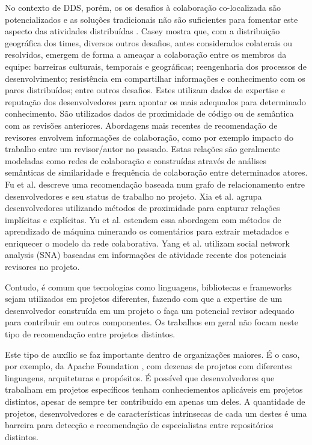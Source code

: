 \documentclass[sigconf]{acmart}
\begin{document}
No contexto de DDS, porém, os os desafios à colaboração co-localizada são potencializados e as soluções tradicionais não são suficientes para fomentar este aspecto das atividades distribuídas \cite{nicolaci2011}. Casey \cite{casey2010} mostra que, com a distribuição geográfica dos times, diversos outros desafios, antes considerados colaterais ou resolvidos, emergem de forma a ameaçar a colaboração entre os membros da equipe: barreiras culturais, temporais e geográficas; reengenharia dos processos de desenvolvimento; resistência em compartilhar informações e conhecimento com os pares distribuídos; entre outros desafios. Estes utilizam dados de expertise e reputação dos desenvolvedores para apontar os mais adequados para determinado conhecimento. São utilizados dados de proximidade de código ou de semântica com as revisões anteriores. Abordagens mais recentes de recomendação de revisores envolvem informações de colaboração, como por exemplo impacto do trabalho entre um revisor/autor no passado. Estas relações são geralmente modeladas como redes de colaboração e construídas através de análises semânticas de similaridade e frequência de colaboração entre determinados atores. Fu et al. \cite{fu2017} descreve uma recomendação baseada num grafo de relacionamento entre desenvolvedores e seu status de trabalho no projeto. Xia et al. \cite{xia2017} agrupa desenvolvedores utilizando métodos de proximidade para capturar relações implícitas e explícitas. Yu et al. \cite{yu2014,yu2014-2} estendem essa abordagem com métodos de aprendizado de máquina minerando os comentários para extrair metadados e enriquecer o modelo da rede colaborativa. Yang et al. \cite{yang2016} utilizam social network analysis (SNA) baseadas em informações de atividade recente dos potenciais revisores no projeto.

Contudo, é comum que tecnologias como linguagens, bibliotecas e frameworks sejam utilizados em projetos diferentes, fazendo com que a expertise de um desenvolvedor construída em um projeto o faça um potencial revisor adequado para contribuir em outros componentes. Os trabalhos em geral não focam neste tipo de recomendação entre projetos distintos.

Este tipo de auxílio se faz importante dentro de organizações maiores. É o caso, por exemplo, da Apache Foundation \cite{chelkowski2016}, com dezenas de projetos com diferentes linguagens, arquiteturas e propósitos. É possível que desenvolvedores que trabalham em projetos específicos tenham conheciementos aplicáveis em projetos distintos, apesar de sempre ter contribuído em apenas um deles. A quantidade de projetos, desenvolvedores e de características intrínsecas de cada um destes é uma barreira para detecção e recomendação de especialistas entre repositórios distintos.
\end{document}
